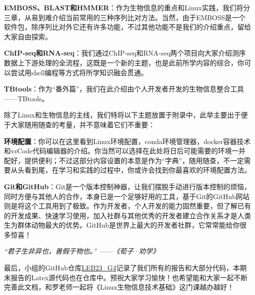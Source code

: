 \textbf{EMBOSS、BLAST和HMMER}：作为生物信息的重点和Linux实践，我们将分三章，从易到难介绍当前常用的三种序列比对方法。当然，由于EMBOSS是一个软件包，除序列比对外它还有许多功能，不过其他功能不是我们的介绍重点，留给大家自由探索。

\textbf{ChIP-seq和RNA-seq}：我们通过ChIP-seq和RNA-seq两个项目向大家介绍测序数据上下游处理的全流程，这既是一个新的主题，也是此前所学内容的综合，你可以尝试用shell编程等方式将所学知识融会贯通。

\textbf{TBtools}：作为“番外篇”，我们在此介绍由个人开发者开发的生物信息整合工具——TBtools。

\vspace{0.5cm}

除了Linux和生物信息的主线，我们特将以下主题放置于附录中，此举主要出于便于大家随用随查的考量，并不意味着它们不重要：

\textbf{环境配置}：你可以在这里看到Linux环境配置，conda环境管理器，docker容器技术和vsCode代码编辑器的介绍。你当然可以选择在此处将日后可能需要的环境一并配好，提供便利；不过这部分内容设置的本意是作为“字典”，随用随查，不一定需要从头看到尾，在学习和实践的过程中，你或许会找到你最喜欢的环境配置方法。

\textbf{Git和GitHub}：Git是一个版本控制神器，让我们摆脱手动进行版本控制的烦恼，同时方便与其他人的合作，本身已是一个足够好用的工具，基于Git的GitHub网站则是将这个工具用到了极致。作为开发者，个人开发的能力固然重要，但了解已有的开发成果、快速学习使用，加入社群与其他优秀的开发者建立合作关系才是人类生为群体动物最大的优势。GitHub是世界上最大的开发者社群，它常常能给你很多惊喜！

\begin{center}
    \textit{“君子生非异也，善假于物也。”    ——《荀子·劝学》}
\end{center}

最后，小组的GitHub仓库\href{https://github.com/Alchemiiiist/LEB23\_G4}{LEB23\_G4}记录了我们所有的报告和大部分代码，本期末报告的Latex源代码也在仓库中。预祝大家学习愉快！也希望能和大家一起不断完善此文档，和罗老师一起将《Linux生物信息技术基础》这门课越办越好！
